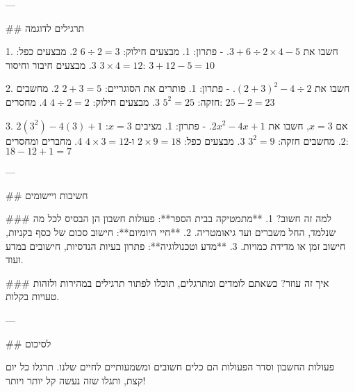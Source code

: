 ---

## תרגילים לדוגמה

1. חשבו את $3 + 6 \div 2 \times 4 - 5$.
   - פתרון: 
     1. מבצעים חילוק: $6 \div 2 = 3$
     2. מבצעים כפל: $3 \times 4 = 12$
     3. מבצעים חיבור וחיסור: $3 + 12 - 5 = 10$

2. חשבו את $(2 + 3)^2 - 4 \div 2$.
   - פתרון:
     1. פותרים את הסוגריים: $2 + 3 = 5$
     2. מחשבים חזקה: $5^2 = 25$
     3. מבצעים חילוק: $4 \div 2 = 2$
     4. מחסרים: $25 - 2 = 23$

3. אם $x = 3$, חשבו את $2x^2 - 4x + 1$.
   - פתרון: 
     1. מציבים $x = 3$: $2(3^2) - 4(3) + 1$
     2. מחשבים חזקה: $3^2 = 9$
     3. מבצעים כפל: $2 \times 9 = 18$ ו-$4 \times 3 = 12$
     4. מחברים ומחסרים: $18 - 12 + 1 = 7$

---

## חשיבות ויישומים

### למה זה חשוב?
1. **מתמטיקה בבית הספר**: פעולות חשבון הן הבסיס לכל מה שנלמד, החל משברים ועד גיאומטריה.
2. **חיי היומיום**: חישוב סכום של כסף בקניות, חישוב זמן או מדידת כמויות.
3. **מדע וטכנולוגיה**: פתרון בעיות הנדסיות, חישובים במדע ועוד.

### איך זה עוזר?
כשאתם לומדים ומתרגלים, תוכלו לפתור תרגילים במהירות ולזהות טעויות בקלות.

---

## לסיכום

פעולות החשבון וסדר הפעולות הם כלים חשובים ומשמעותיים לחיים שלנו. תרגלו כל יום קצת, ותגלו שזה נעשה קל יותר ויותר!
